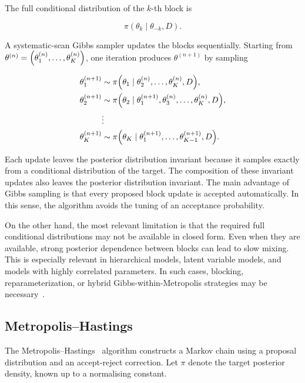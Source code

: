 The full conditional distribution of the $k$-th block is

\begin{equation}
    \pi(\theta_k\mid\theta_{-k},D).
    \label{eq:gibbs-full-conditional-background}
\end{equation}

A systematic-scan Gibbs sampler updates the blocks sequentially.
Starting from $\theta^{(n)}=\qty(\theta_1^{(n)},\dots,\theta_K^{(n)})$, one iteration produces $\theta^{(n+1)}$ by sampling

\begin{align}
    \theta_1^{(n+1)}
    &\sim
    \pi\qty(\theta_1\mid\theta_2^{(n)},\dots,\theta_K^{(n)},D),
    \label{eq:gibbs-step-1-background}
    \\
    \theta_2^{(n+1)}
    &\sim
    \pi\qty(\theta_2\mid\theta_1^{(n+1)},\theta_3^{(n)},\dots,\theta_K^{(n)},D),
    \label{eq:gibbs-step-2-background}
    \\
    &\vdots
    \nonumber
    \\
    \theta_K^{(n+1)}
    &\sim
    \pi\qty(\theta_K\mid\theta_1^{(n+1)},\dots,\theta_{K-1}^{(n+1)},D).
    \label{eq:gibbs-step-k-background}
\end{align}

Each update leaves the posterior distribution invariant because it samples exactly from a conditional distribution of the target.
The composition of these invariant updates also leaves the posterior distribution invariant.
The main advantage of Gibbs sampling is that every proposed block update is accepted automatically.
In this sense, the algorithm avoids the tuning of an acceptance probability.

On the other hand, the most relevant limitation is that the required full conditional distributions may not be available in closed form.
Even when they are available, strong posterior dependence between blocks can lead to slow mixing.
This is especially relevant in hierarchical models, latent variable models, and models with highly correlated parameters.
In such cases, blocking, reparameterization, or hybrid Gibbs-within-Metropolis strategies may be necessary~\cite{gilks1995}.

\subsection{Metropolis--Hastings}
\label{subsec:metropolis}

The Metropolis--Hastings~\cite{metropolis1953, hastings1970} algorithm constructs a Markov chain using a proposal distribution and an accept-reject correction.
Let $\pi$ denote the target posterior density, known up to a normalising constant.

